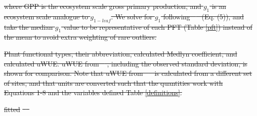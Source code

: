 \documentclass[hess, manuscript]{copernicus}
\providecommand{\DIFdeltex}[1]{{\protect\color{red}\sout{#1}}}                      %
\providecommand{\DIFdelFL}[1]{\DIFdel{#1}} %
\providecommand{\DIFdel}[1]{\texorpdfstring{\DIFdeltex{#1}}{}} %
\begin{document}
\DIFdel{where GPP is the ecosystem scale gross primary production, and $g_1$
is an ecosystem scale analogue to $g_{1-leaf}$. We solve for $g_1$
following \mbox{%
\citet{Medlyn_2017} }%
(Eq. (5)), and take the median $g_1$
value to be representative of each PFT (Table \ref{pft}) instead of the mean to avoid extra weighting of rare outliers.
}%

{%
\DIFdelFL{Plant functional types, their abbreviation, calculated
    Medlyn coefficient, and calculated uWUE. uWUE from
    \mbox{%
\citet{Zhou_2015}}%
, including the observed standard deviation, is
    shown for comparison. Note that uWUE from \mbox{%
\citet{Zhou_2015} }%
is
    calculated from a different set of sites, and that units are
    converted such that the quantities work with Equations 1-8 and the
    variables defined Table \ref{definitions}.}}

\DIFdelFL{fitted }%
\DIFdelFL{\mbox{%
\citet{Zhou_2015} }%
}%
\end{document}
